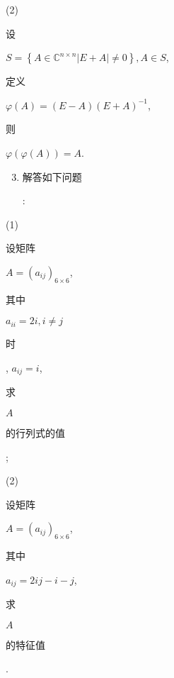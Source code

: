 \documentclass[10pt]{article}
\begin{document}
(2) \begin{CJK}{UTF8}{mj}设\end{CJK} $S=\left\{A \in \mathbb{C}^{n \times n}|E+A| \neq 0\right\}, A \in S$, \begin{CJK}{UTF8}{mj}定义\end{CJK} $\varphi(A)=(E-A)(E+A)^{-1}$, \begin{CJK}{UTF8}{mj}则\end{CJK} $\varphi(\varphi(A))=A$.

\begin{enumerate}
  \setcounter{enumi}{2}
  \item \begin{CJK}{UTF8}{mj}解答如下问题\end{CJK}:
\end{enumerate}
(1) \begin{CJK}{UTF8}{mj}设矩阵\end{CJK} $A=\left(a_{i j}\right)_{6 \times 6}$, \begin{CJK}{UTF8}{mj}其中\end{CJK} $a_{i i}=2 i, i \neq j$ \begin{CJK}{UTF8}{mj}时\end{CJK}, $a_{i j}=i$, \begin{CJK}{UTF8}{mj}求\end{CJK} $A$ \begin{CJK}{UTF8}{mj}的行列式的值\end{CJK};

(2) \begin{CJK}{UTF8}{mj}设矩阵\end{CJK} $A=\left(a_{i j}\right)_{6 \times 6}$, \begin{CJK}{UTF8}{mj}其中\end{CJK} $a_{i j}=2 i j-i-j$, \begin{CJK}{UTF8}{mj}求\end{CJK} $A$ \begin{CJK}{UTF8}{mj}的特征值\end{CJK}.
\end{document}
